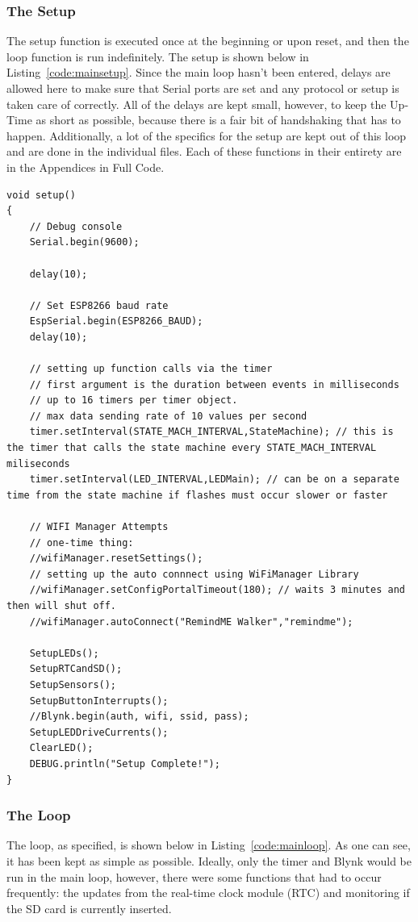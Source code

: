 \documentclass{article}
\begin{document}
\subsubsection{The Setup}

The setup function is executed once at the beginning or upon reset, and then the loop function is run indefinitely. The setup is shown below in Listing~\ref{code:mainsetup}. Since the main loop hasn't been entered, delays are allowed here to make sure that Serial ports are set and any protocol or setup is taken care of correctly. All of the delays are kept small, however, to keep the Up-Time as short as possible, because there is a fair bit of handshaking that has to happen. Additionally, a lot of the specifics for the setup are kept out of this loop and are done in the individual files. Each of these functions in their entirety are in the Appendices in Full Code. 

\begin{lstlisting}[caption={The Main Setup}, label={code:mainsetup}]
void setup()
{
	// Debug console
	Serial.begin(9600);
	
	delay(10);
	
	// Set ESP8266 baud rate
	EspSerial.begin(ESP8266_BAUD);
	delay(10);
	
	// setting up function calls via the timer 
	// first argument is the duration between events in milliseconds 
	// up to 16 timers per timer object. 
	// max data sending rate of 10 values per second
	timer.setInterval(STATE_MACH_INTERVAL,StateMachine); // this is the timer that calls the state machine every STATE_MACH_INTERVAL miliseconds
	timer.setInterval(LED_INTERVAL,LEDMain); // can be on a separate time from the state machine if flashes must occur slower or faster 
	
	// WIFI Manager Attempts 
	// one-time thing: 
	//wifiManager.resetSettings(); 
	// setting up the auto connnect using WiFiManager Library
	//wifiManager.setConfigPortalTimeout(180); // waits 3 minutes and then will shut off. 
	//wifiManager.autoConnect("RemindME Walker","remindme"); 
	
	SetupLEDs(); 
	SetupRTCandSD();   
	SetupSensors(); 
	SetupButtonInterrupts(); 
	//Blynk.begin(auth, wifi, ssid, pass);
	SetupLEDDriveCurrents(); 
	ClearLED(); 
	DEBUG.println("Setup Complete!"); 
}
\end{lstlisting}


\subsubsection{The Loop}
The loop, as specified, is shown below in Listing~\ref{code:mainloop}. As one can see, it has been kept as simple as possible. Ideally, only the timer and Blynk would be run in the main loop, however, there were some functions that had to occur frequently: the updates from the real-time clock module (RTC) and monitoring if the SD card is currently inserted. 
\end{document}
